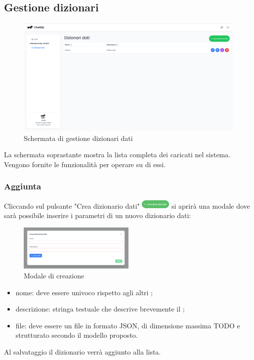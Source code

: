\subsection{Gestione dizionari}
\begin{figure}[H]
  \centering
  \includegraphics[width=1\textwidth]{assets/dd_list.png}
  \caption{Schermata di gestione dizionari dati}
\end{figure}
\par La schermata soprastante mostra la lista completa dei  caricati nel sistema. Vengono fornite le funzionalità per operare su di essi.

\subsubsection{Aggiunta }
Cliccando sul pulsante "Crea dizionario dati" \includegraphics[height=1.2em]{assets/dd_create_button.png} si aprirà una modale dove sarà possibile inserire i parametri di un nuovo dizionario dati:
\begin{figure}[H]
  \centering
  \includegraphics[width=0.5\textwidth]{assets/dd_modal_create.png}
  \caption{Modale di creazione }
\end{figure}
\begin{itemize}
  \item nome: deve essere univoco rispetto agli altri ;
  \item descrizione: stringa testuale che descrive brevemente il ;
  \item file: deve essere un file in formato JSON, di dimensione massima TODO e strutturato secondo il modello proposto.
\end{itemize}
Al salvataggio il dizionario verrà aggiunto alla lista.

